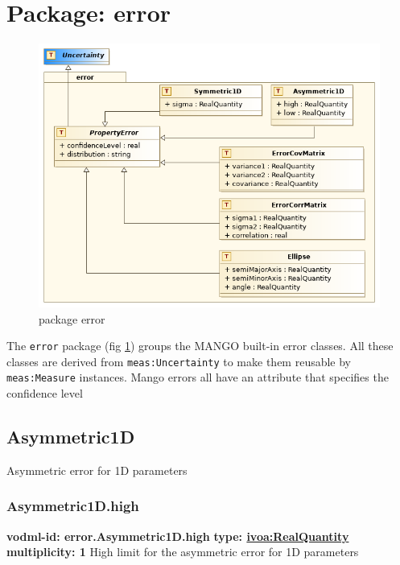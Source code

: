 \pagebreak
\section{Package: error }
  \begin{figure}[h]
    \includegraphics[width=1.0\textwidth]{../model/error.png}
    \caption{package error}
    \label{fig:error}
  \end{figure}




  The \texttt{error} package (fig \ref{fig:error}) groups the MANGO built-in error classes. All these classes are derived from \texttt{meas:Uncertainty} to make them reusable by \texttt{meas:Measure} instances. Mango errors all have an attribute that specifies the confidence level

  \subsection{Asymmetric1D}
  \label{sect:error.Asymmetric1D}
    Asymmetric error for 1D parameters

    \subsubsection{Asymmetric1D.high}
      \textbf{vodml-id: error.Asymmetric1D.high} \newline
      \textbf{type: \hyperref[sect:ivoa]{ivoa:RealQuantity}} \newline
      \textbf{multiplicity: 1} \newline
      High limit for the asymmetric error for 1D parameters

